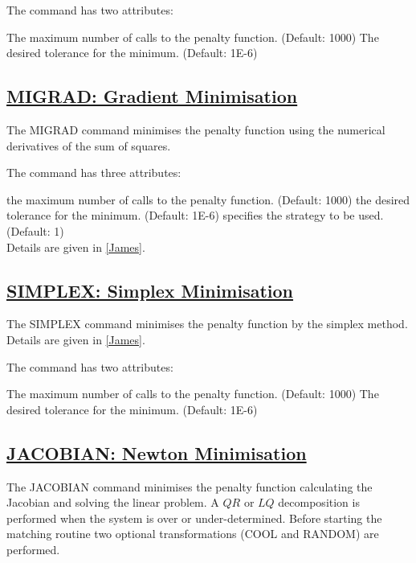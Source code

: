 
The command has two attributes:  
\begin{madlist}
    The maximum number of calls to the penalty function. (Default: 1000)
    The desired tolerance for the minimum. (Default: 1E-6) 
\end{madlist}

\subsection{\href{migrad}{MIGRAD: Gradient Minimisation}}
\label{subsec:match_migrad}
The MIGRAD command minimises the penalty function using the numerical
derivatives of the sum of squares.  


The command has three attributes: 
\begin{madlist}
    the maximum number of calls to the penalty function. (Default: 1000)
    the desired tolerance for the minimum. (Default: 1E-6)
    specifies the strategy to be used. (Default: 1) \\
   Details are given in \href{bibliography.html#minuit}{[James]}.  
\end{madlist} 

\subsection{\href{simplex}{SIMPLEX: Simplex Minimisation}}
\label{subsec:match_simplex}
The SIMPLEX command minimises the penalty function by the simplex
method. Details are given in \href{bibliography.html#minuit}{[James]}.


The command has two attributes: 
\begin{madlist}
    The maximum number of calls to the penalty function. (Default: 1000)
    The desired tolerance for the minimum. (Default: 1E-6)
\end{madlist} 

\subsection{\href{jacobian}{JACOBIAN: Newton Minimisation}}
\label{subsec:match_jacobian}
The JACOBIAN command minimises the penalty function calculating the
Jacobian and solving the linear problem. A $Q R$ or $L Q$  decomposition is
performed when the system is over or under-determined. Before starting
the matching routine two optional transformations (COOL and RANDOM) are
performed. 

